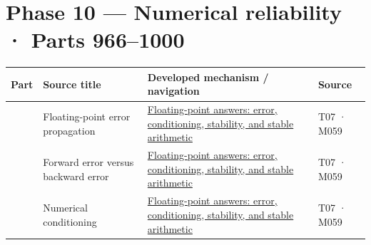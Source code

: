 \section{Phase 10 --- Numerical reliability · Parts 966--1000}\label{appendix-fd090d982a15-phase-10-numerical-reliability-parts-9661000}

{\def\LTcaptype{none} %
\begin{longtable}[]{@{}
  >{\raggedleft\arraybackslash}p{}
  >{\raggedright\arraybackslash}p{}
  >{\raggedright\arraybackslash}p{}
  >{\raggedright\arraybackslash}p{}@{}}
\toprule\noalign{}
\begin{minipage}[b]{\linewidth}\raggedleft
Part
\end{minipage} & \begin{minipage}[b]{\linewidth}\raggedright
Source title
\end{minipage} & \begin{minipage}[b]{\linewidth}\raggedright
Developed mechanism / navigation
\end{minipage} & \begin{minipage}[b]{\linewidth}\raggedright
Source
\end{minipage} \\
\midrule\noalign{}
\endhead
\bottomrule\noalign{}
\endlastfoot
966 & Floating-point error propagation & \href{Continuous\%20Notes/Computing\%20Foundations\%20-\%20From\%20Bits\%20to\%20C++\%20and\%20Systems\%20APIs\#Floating-point\%20answers:\%20error,\%20conditioning,\%20stability,\%20and\%20stable\%20arithmetic/}{Floating-point answers: error, conditioning, stability, and stable arithmetic} & T07 · M059 \\
967 & Forward error versus backward error & \href{Continuous\%20Notes/Computing\%20Foundations\%20-\%20From\%20Bits\%20to\%20C++\%20and\%20Systems\%20APIs\#Floating-point\%20answers:\%20error,\%20conditioning,\%20stability,\%20and\%20stable\%20arithmetic/}{Floating-point answers: error, conditioning, stability, and stable arithmetic} & T07 · M059 \\
968 & Numerical conditioning & \href{Continuous\%20Notes/Computing\%20Foundations\%20-\%20From\%20Bits\%20to\%20C++\%20and\%20Systems\%20APIs\#Floating-point\%20answers:\%20error,\%20conditioning,\%20stability,\%20and\%20stable\%20arithmetic/}{Floating-point answers: error, conditioning, stability, and stable arithmetic} & T07 · M059 \\

\end{longtable}}
